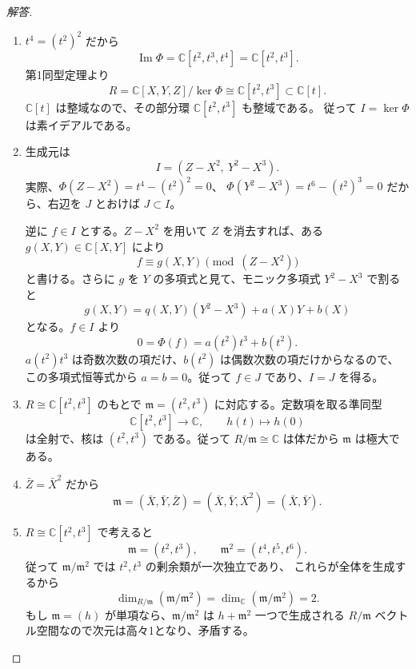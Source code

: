 \begin{proof}[解答]
\begin{enumerate}
  \item[(1)] $t^4=(t^2)^2$ だから
  \[
  \operatorname{Im}\Phi=\mathbb C[t^2,t^3,t^4]
  =\mathbb C[t^2,t^3].
  \]
  第1同型定理より
  \[
  R=\mathbb C[X,Y,Z]/\ker\Phi
  \cong\mathbb C[t^2,t^3]\subset\mathbb C[t].
  \]
  $\mathbb C[t]$ は整域なので、その部分環 $\mathbb C[t^2,t^3]$ も整域である。
  従って $I=\ker\Phi$ は素イデアルである。
  \item[(2)] 生成元は
  \[
  I=(Z-X^2,\ Y^2-X^3).
  \]
  実際、$\Phi(Z-X^2)=t^4-(t^2)^2=0$、
  $\Phi(Y^2-X^3)=t^6-(t^2)^3=0$ だから、右辺を $J$ とおけば $J\subset I$。

  逆に $f\in I$ とする。$Z-X^2$ を用いて $Z$ を消去すれば、ある
  $g(X,Y)\in\mathbb C[X,Y]$ により
  \[
  f\equiv g(X,Y)\pmod{(Z-X^2)}
  \]
  と書ける。さらに $g$ を $Y$ の多項式と見て、モニック多項式
  $Y^2-X^3$ で割ると
  \[
  g(X,Y)=q(X,Y)(Y^2-X^3)+a(X)Y+b(X)
  \]
  となる。$f\in I$ より
  \[
  0=\Phi(f)=a(t^2)t^3+b(t^2).
  \]
  $a(t^2)t^3$ は奇数次数の項だけ、$b(t^2)$ は偶数次数の項だけからなるので、
  この多項式恒等式から $a=b=0$。従って $f\in J$ であり、$I=J$ を得る。

  \item[(3)] $R\cong\mathbb C[t^2,t^3]$ のもとで
  $\mathfrak m=(t^2,t^3)$ に対応する。定数項を取る準同型
  \[
  \mathbb C[t^2,t^3]\longrightarrow\mathbb C,\qquad h(t)\longmapsto h(0)
  \]
  は全射で、核は $(t^2,t^3)$ である。従って
  $R/\mathfrak m\cong\mathbb C$ は体だから $\mathfrak m$ は極大である。

  \item[(4)] $\bar Z=\bar X^2$ だから
  \[
  \mathfrak m=(\bar X,\bar Y,\bar Z)
  =(\bar X,\bar Y,\bar X^2)=(\bar X,\bar Y).
  \]

  \item[(5)] $R\cong\mathbb C[t^2,t^3]$ で考えると
  \[
  \mathfrak m=(t^2,t^3),\qquad
  \mathfrak m^2=(t^4,t^5,t^6).
  \]
  従って $\mathfrak m/\mathfrak m^2$ では $t^2,t^3$ の剰余類が一次独立であり、
  これらが全体を生成するから
  \[
  \dim_{R/\mathfrak m}(\mathfrak m/\mathfrak m^2)
  =\dim_{\mathbb C}(\mathfrak m/\mathfrak m^2)=2.
  \]
  もし $\mathfrak m=(h)$ が単項なら、$\mathfrak m/\mathfrak m^2$ は
  $h+\mathfrak m^2$ 一つで生成される $R/\mathfrak m$ ベクトル空間なので次元は高々1となり、矛盾する。
\end{enumerate}
\end{proof}

